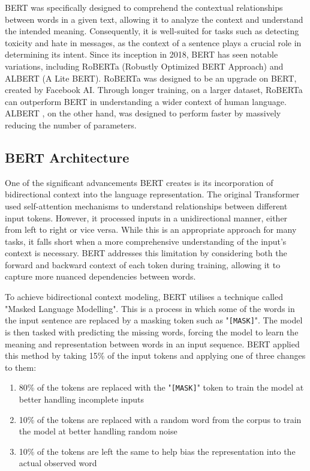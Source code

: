 BERT was specifically designed to comprehend the contextual relationships between words in a given text, allowing it to analyze the context and understand the intended meaning. Consequently, it is well-suited for tasks such as detecting toxicity and hate in messages, as the context of a sentence plays a crucial role in determining its intent. Since its inception in 2018, BERT has seen notable variations, including RoBERTa (Robustly Optimized BERT Approach) and ALBERT (A Lite BERT). RoBERTa \cite{RoBERTa} was designed to be an upgrade on BERT, created by Facebook AI. Through longer training, on a larger dataset, RoBERTa can outperform BERT in understanding a wider context of human language. ALBERT \cite{AlBERT}, on the other hand, was designed to perform faster by massively reducing the number of parameters.

\subsection{BERT Architecture}

One of the significant advancements BERT creates is its incorporation of bidirectional context into the language representation. The original Transformer used self-attention mechanisms to understand relationships between different input tokens. However, it processed inputs in a unidirectional manner, either from left to right or vice versa. While this is an appropriate approach for many tasks, it falls short when a more comprehensive understanding of the input's context is necessary. BERT addresses this limitation by considering both the forward and backward context of each token during training, allowing it to capture more nuanced dependencies between words.

To achieve bidirectional context modeling, BERT utilises a technique called "Masked Language Modelling". This is a process in which some of the words in the input sentence are replaced by a masking token such as "\verb|[MASK]|". The model is then tasked with predicting the missing words, forcing the model to learn the meaning and representation between words in an input sequence. BERT applied this method by taking 15\% of the input tokens and applying one of three changes to them:

\begin{enumerate}
    \item 80\% of the tokens are replaced with the "\verb|[MASK]|" token to train the model at better handling incomplete inputs
    \item 10\% of the tokens are replaced with a random word from the corpus to train the model at better handling random noise
    \item 10\% of the tokens are left the same to help bias the representation into the actual observed word
\end{enumerate}

